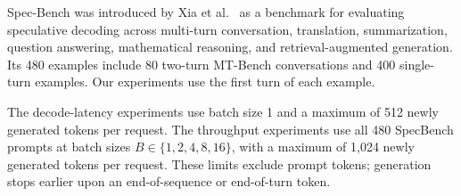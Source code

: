 Spec-Bench was introduced by Xia et al.~\cite{xia2024unlocking}
as a benchmark for evaluating speculative decoding across multi-turn
conversation, translation, summarization, question answering,
mathematical reasoning, and retrieval-augmented generation.
Its 480 examples include 80 two-turn MT-Bench conversations and
400 single-turn examples. Our experiments use the first turn of
each example.

The decode-latency experiments use batch size 1 and a maximum of
512 newly generated tokens per request. The throughput experiments
use all 480 SpecBench prompts at batch sizes
$B\in\{1,2,4,8,16\}$, with a maximum of 1,024 newly generated tokens
per request. These limits exclude prompt tokens; generation stops
earlier upon an end-of-sequence or end-of-turn token.
